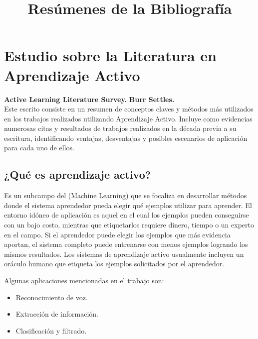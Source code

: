 \documentclass[11pt,spanish]{article}
\title{Resúmenes de la Bibliografía}
\begin{document}
\maketitle

\section{Estudio sobre la Literatura en Aprendizaje Activo}

\textbf{Active Learning Literature Survey.}
\textbf{Burr Settles.}
\\
Este escrito consiste en un resumen de conceptos claves y métodos más utilizados
en los trabajos realizados utilizando Aprendizaje Activo. Incluye como evidencias
numerosas citas y resultados de trabajos realizados en la década previa a su
escritura, identificando ventajas, desventajas y posibles escenarios de aplicación
para cada uno de ellos.

\subsection{¿Qué es aprendizaje activo?}
Es un subcampo del (Machine Learning) que se focaliza en desarrollar métodos
donde el sistema aprendedor pueda elegir qué ejemplos utilizar para aprender.
El entorno idóneo de aplicación es aquel en el cual los ejemplos pueden
conseguirse con un bajo costo, mientras que etiquetarlos requiere dinero, tiempo
o un experto en el campo. Si el aprendedor puede elegir los ejemplos que más
evidencia aportan, el sistema completo puede entrenarse con menos ejemplos
logrando los mismos resultados.
Los sistemas de aprendizaje activo usualmente incluyen un oráculo humano que
etiqueta los ejemplos solicitados por el aprendedor.

Algunas aplicaciones mencionadas en el trabajo son:
\begin{itemize}
    \item Reconocimiento de voz.
    \item Extracción de información.
    \item Clasificación y filtrado.
\end{itemize}
\end{document}
